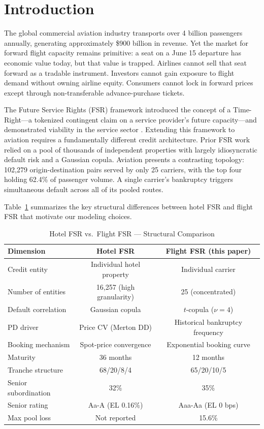 \documentclass[12pt,a4paper]{article}
\begin{document}
\section{Introduction}

The global commercial aviation industry transports over 4 billion passengers annually, generating approximately \$900 billion in revenue. Yet the market for forward flight capacity remains primitive: a seat on a June 15 departure has economic value today, but that value is trapped. Airlines cannot sell that seat forward as a tradable instrument. Investors cannot gain exposure to flight demand without owning airline equity. Consumers cannot lock in forward prices except through non-transferable advance-purchase tickets.

The Future Service Rights (FSR) framework introduced the concept of a Time-Right---a tokenized contingent claim on a service provider's future capacity---and demonstrated viability in the service sector \cite{fsr2026}. Extending this framework to aviation requires a fundamentally different credit architecture. Prior FSR work relied on a pool of thousands of independent properties with largely idiosyncratic default risk and a Gaussian copula. Aviation presents a contrasting topology: 102,279 origin-destination pairs served by only 25 carriers, with the top four holding 62.4\% of passenger volume. A single carrier's bankruptcy triggers simultaneous default across all of its pooled routes.

Table~\ref{tab:hotel_vs_flight} summarizes the key structural differences between hotel FSR and flight FSR that motivate our modeling choices.

\begin{table}[H]
\centering
\caption{Hotel FSR vs.\ Flight FSR — Structural Comparison}
\label{tab:hotel_vs_flight}
\begin{tabular}{lcc}
\toprule
\textbf{Dimension} & \textbf{Hotel FSR} & \textbf{Flight FSR (this paper)} \\
\midrule
Credit entity        & Individual hotel property & Individual carrier \\
Number of entities   & 16,257 (high granularity) & 25 (concentrated) \\
Default correlation  & Gaussian copula & $t$-copula ($\nu = 4$) \\
PD driver            & Price CV (Merton DD) & Historical bankruptcy frequency \\
Booking mechanism    & Spot-price convergence & Exponential booking curve \\
Maturity             & 36 months & 12 months \\
Tranche structure    & 68/20/8/4 & 65/20/10/5 \\
Senior subordination & 32\% & 35\% \\
Senior rating        & Aa-A (EL 0.16\%) & Aaa-Aa (EL 0 bps) \\
Max pool loss        & Not reported & 15.6\% \\
\bottomrule
\end{tabular}
\end{table}
\end{document}

